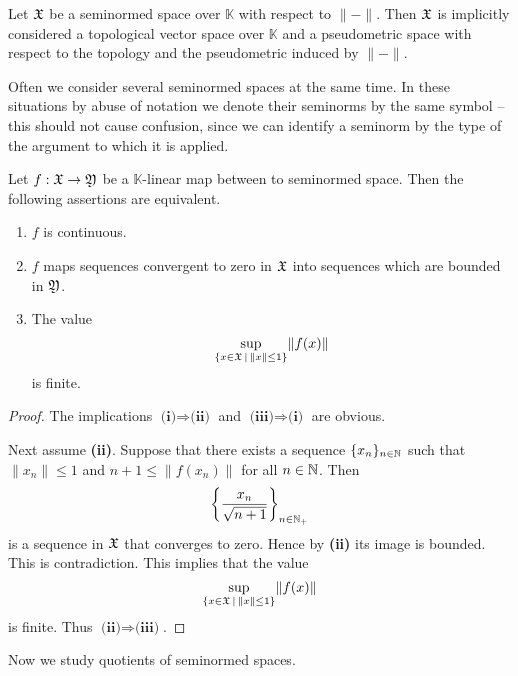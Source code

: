 \documentclass[10pt]{amsart}
\begin{document}
\begin{remark}\label{remark:topology_induced_by_seminorm_is_canonical}
	Let ${\mathfrak X}$ be a seminormed space over $\mathbb{K}$ with respect to $\lVert - \rVert$. Then ${\mathfrak X}$ is implicitly considered a topological vector space over $\mathbb{K}$ and a pseudometric space with respect to the topology and the pseudometric induced by $\lVert - \rVert$.
\end{remark}
\noindent
Often we consider several seminormed spaces at the same time. In these situations by abuse of notation we denote their seminorms by the same symbol – this should not cause confusion, since we can identify a seminorm by the type of the argument to which it is applied.

\begin{theorem}\label{theorem:characterization_of_morphisms_of_seminormed_spaces}
	Let $f:{\mathfrak X} \rightarrow {\mathfrak Y}$ be a $\mathbb{K}$-linear map between to seminormed space. Then the following assertions are equivalent.
	\begin{enumerate}[label=\emph{\textbf{(\roman*)}}, leftmargin=*]
		\item $f$ is continuous.
		\item $f$ maps sequences convergent to zero in ${\mathfrak X}$ into sequences which are bounded in ${\mathfrak Y}$.
		\item The value
		      $$\sup_{\{x\in {\mathfrak X}\,|\,\lVert x \rVert \leq 1\}}\lVert f(x)\rVert$$ is finite.
	\end{enumerate}
\end{theorem}
\begin{proof}
	The implications $\textbf{(i)}\Rightarrow \textbf{(ii)}$ and $\textbf{(iii)}\Rightarrow \textbf{(i)}$ are obvious.

	Next assume \textbf{(ii)}. Suppose that there exists a sequence $\{x_n\}_{n\in {\mathbb N}}$ such that $\lVert x_n \rVert \leq 1$ and $n + 1 \leq \lVert f(x_n) \rVert$ for all $n \in {\mathbb N}$. Then
	$$\left\{\frac{x_n}{\sqrt{n + 1}}\right\}_{n \in {\mathbb N}_+}$$
	is a sequence in ${\mathfrak X}$ that converges to zero. Hence by \textbf{(ii)} its image is bounded. This is contradiction. This implies that the value
	$$\sup_{\{x\in {\mathfrak X}\,|\,\lVert x \rVert \leq 1\}}\lVert f(x)\rVert$$
	is finite. Thus $\textbf{(ii)}\Rightarrow \textbf{(iii)}$.
\end{proof}
\noindent
Now we study quotients of seminormed spaces.
\end{document}
